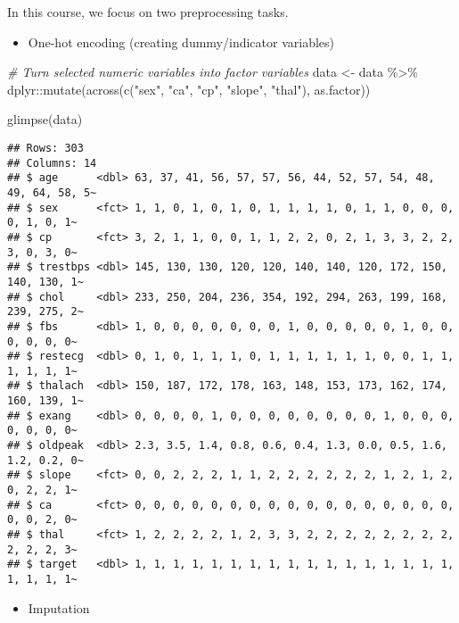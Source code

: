 \documentclass[
]{book}
\newenvironment{Shaded}{\begin{snugshade}}{\end{snugshade}}
\newcommand{\CommentTok}[1]{\textcolor[rgb]{0.56,0.35,0.01}{\textit{#1}}}
\newcommand{\FunctionTok}[1]{\textcolor[rgb]{0.00,0.00,0.00}{#1}}
\newcommand{\NormalTok}[1]{#1}
\newcommand{\OtherTok}[1]{\textcolor[rgb]{0.56,0.35,0.01}{#1}}
\newcommand{\SpecialCharTok}[1]{\textcolor[rgb]{0.00,0.00,0.00}{#1}}
\newcommand{\StringTok}[1]{\textcolor[rgb]{0.31,0.60,0.02}{#1}}
\providecommand{\tightlist}{%
  \setlength{\itemsep}{0pt}\setlength{\parskip}{0pt}}
\begin{document}
In this course, we focus on two preprocessing tasks.

\begin{itemize}
\tightlist
\item
  One-hot encoding (creating dummy/indicator variables)
\end{itemize}

\begin{Shaded}
\begin{Highlighting}[]
\CommentTok{\# Turn selected numeric variables into factor variables}
\NormalTok{data }\OtherTok{\textless{}{-}}\NormalTok{ data }\SpecialCharTok{\%\textgreater{}\%}
\NormalTok{  dplyr}\SpecialCharTok{::}\FunctionTok{mutate}\NormalTok{(}\FunctionTok{across}\NormalTok{(}\FunctionTok{c}\NormalTok{(}\StringTok{"sex"}\NormalTok{, }\StringTok{"ca"}\NormalTok{, }\StringTok{"cp"}\NormalTok{, }\StringTok{"slope"}\NormalTok{, }\StringTok{"thal"}\NormalTok{), as.factor))}

\FunctionTok{glimpse}\NormalTok{(data)}
\end{Highlighting}
\end{Shaded}

\begin{verbatim}
## Rows: 303
## Columns: 14
## $ age      <dbl> 63, 37, 41, 56, 57, 57, 56, 44, 52, 57, 54, 48, 49, 64, 58, 5~
## $ sex      <fct> 1, 1, 0, 1, 0, 1, 0, 1, 1, 1, 1, 0, 1, 1, 0, 0, 0, 0, 1, 0, 1~
## $ cp       <fct> 3, 2, 1, 1, 0, 0, 1, 1, 2, 2, 0, 2, 1, 3, 3, 2, 2, 3, 0, 3, 0~
## $ trestbps <dbl> 145, 130, 130, 120, 120, 140, 140, 120, 172, 150, 140, 130, 1~
## $ chol     <dbl> 233, 250, 204, 236, 354, 192, 294, 263, 199, 168, 239, 275, 2~
## $ fbs      <dbl> 1, 0, 0, 0, 0, 0, 0, 0, 1, 0, 0, 0, 0, 0, 1, 0, 0, 0, 0, 0, 0~
## $ restecg  <dbl> 0, 1, 0, 1, 1, 1, 0, 1, 1, 1, 1, 1, 1, 0, 0, 1, 1, 1, 1, 1, 1~
## $ thalach  <dbl> 150, 187, 172, 178, 163, 148, 153, 173, 162, 174, 160, 139, 1~
## $ exang    <dbl> 0, 0, 0, 0, 1, 0, 0, 0, 0, 0, 0, 0, 0, 1, 0, 0, 0, 0, 0, 0, 0~
## $ oldpeak  <dbl> 2.3, 3.5, 1.4, 0.8, 0.6, 0.4, 1.3, 0.0, 0.5, 1.6, 1.2, 0.2, 0~
## $ slope    <fct> 0, 0, 2, 2, 2, 1, 1, 2, 2, 2, 2, 2, 2, 1, 2, 1, 2, 0, 2, 2, 1~
## $ ca       <fct> 0, 0, 0, 0, 0, 0, 0, 0, 0, 0, 0, 0, 0, 0, 0, 0, 0, 0, 0, 2, 0~
## $ thal     <fct> 1, 2, 2, 2, 2, 1, 2, 3, 3, 2, 2, 2, 2, 2, 2, 2, 2, 2, 2, 2, 3~
## $ target   <dbl> 1, 1, 1, 1, 1, 1, 1, 1, 1, 1, 1, 1, 1, 1, 1, 1, 1, 1, 1, 1, 1~
\end{verbatim}

\begin{itemize}
\tightlist
\item
  Imputation
\end{itemize}
\end{document}
